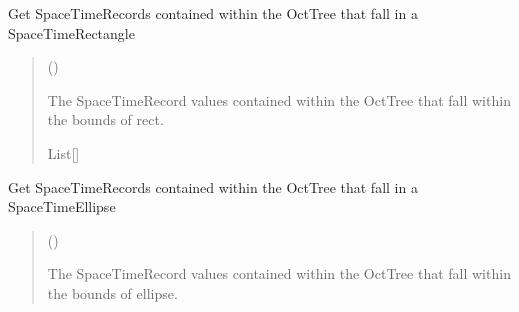 \documentclass[letterpaper,10pt,english]{sphinxmanual}
\begin{document}
\begin{fulllineitems}
\begin{fulllineitems}
\label{\detokenize{octtree:GeoSpatialTools.octtree.OctTree.query}}
\pysigstartsignatures
\pysiglinewithargsret
{}
{\sphinxparamcomma {}}
{}
\pysigstopsignatures
\sphinxAtStartPar
Get SpaceTimeRecords contained within the OctTree that fall in a
SpaceTimeRectangle
\begin{quote}\begin{description}
\sphinxAtStartPar
{} ({\hyperref[\detokenize{shape:GeoSpatialTools.shape.SpaceTimeRectangle}]{}})

\sphinxAtStartPar
The SpaceTimeRecord values contained within the OctTree that fall
within the bounds of rect.

\sphinxAtStartPar
List{[}{\hyperref[\detokenize{record:GeoSpatialTools.record.SpaceTimeRecord}]{}}{]}

\end{description}\end{quote}

\end{fulllineitems}


\begin{fulllineitems}
\label{\detokenize{octtree:GeoSpatialTools.octtree.OctTree.query_ellipse}}
\pysigstartsignatures
\pysiglinewithargsret
{}
{\sphinxparamcomma {}}
{}
\pysigstopsignatures
\sphinxAtStartPar
Get SpaceTimeRecords contained within the OctTree that fall in a
SpaceTimeEllipse
\begin{quote}\begin{description}
\sphinxAtStartPar
{} ({\hyperref[\detokenize{shape:GeoSpatialTools.shape.SpaceTimeEllipse}]{}})

\sphinxAtStartPar
The SpaceTimeRecord values contained within the OctTree that fall
within the bounds of ellipse.


\end{description}
\end{quote}
\end{fulllineitems}
\end{fulllineitems}
\end{document}
